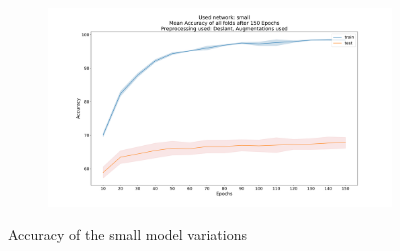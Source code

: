 \documentclass{article}
\begin{document}
\begin{minipage}[!h]{1\linewidth}
\begin{figure}[H]
\begin{adjustwidth}{-8em}{-8em}
\begin{subfigure}{0.7\textwidth}
    \end{subfigure}
    \begin{subfigure}{0.7\textwidth}
        \centering
        \includegraphics[width=\textwidth]{Deslant_small_150_augmentations_acc}
    \end{subfigure}
    \end{adjustwidth}
\caption{Accuracy of the small model variations}

\label{fig:AccuracySmall}
\end{figure}


\end{minipage}
\end{document}
